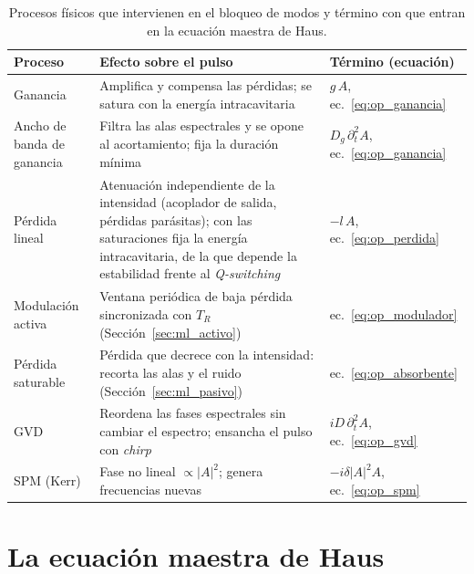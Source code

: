 \begin{table}[h]
    \centering
    \small
    \caption{Procesos físicos que intervienen en el bloqueo de modos y término con que entran en la ecuación maestra de Haus.}
    \label{tab:procesos}
    \begin{tabular}{p{} p{} p{}}
        \toprule
        Proceso & Efecto sobre el pulso & Término (ecuación) \\
        \midrule
        Ganancia & Amplifica y compensa las pérdidas; se satura con la energía intracavitaria & $g\,A$, ec.~\eqref{eq:op_ganancia} \\
        Ancho de banda de ganancia & Filtra las alas espectrales y se opone al acortamiento; fija la duración mínima & $D_g\,\partial_t^2A$, ec.~\eqref{eq:op_ganancia} \\
        Pérdida lineal & Atenuación independiente de la intensidad (acoplador de salida, pérdidas parásitas); con las saturaciones fija la energía intracavitaria, de la que depende la estabilidad frente al \emph{Q-switching} \cite[sec.~9.7]{Keller2022} & $-l\,A$, ec.~\eqref{eq:op_perdida} \\
        Modulación activa & Ventana periódica de baja pérdida sincronizada con $T_R$ (Sección~\ref{sec:ml_activo}) & ec.~\eqref{eq:op_modulador} \\
        Pérdida saturable & Pérdida que decrece con la intensidad: recorta las alas y el ruido (Sección~\ref{sec:ml_pasivo}) & ec.~\eqref{eq:op_absorbente} \\
        GVD & Reordena las fases espectrales sin cambiar el espectro; ensancha el pulso con \emph{chirp} & $iD\,\partial_t^2A$, ec.~\eqref{eq:op_gvd} \\
        SPM (Kerr) & Fase no lineal $\propto|A|^2$; genera frecuencias nuevas & $-i\delta|A|^2A$, ec.~\eqref{eq:op_spm} \\
        \bottomrule
    \end{tabular}
\end{table}



\section{La ecuación maestra de Haus}
\label{sec:haus}


